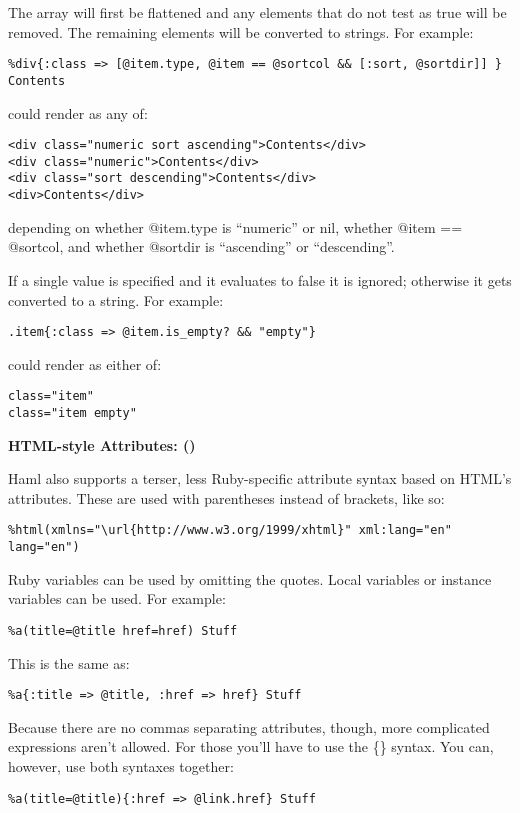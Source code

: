 \documentclass[10pt]{article}
\begin{document}
 The array will first be flattened and any elements that do not test as true will be removed. The remaining elements will be converted to strings. For example:
\begin{verbatim}
%div{:class => [@item.type, @item == @sortcol && [:sort, @sortdir]] } Contents
\end{verbatim}


 could render as any of:
\begin{verbatim}
<div class="numeric sort ascending">Contents</div>
<div class="numeric">Contents</div>
<div class="sort descending">Contents</div>
<div>Contents</div>
\end{verbatim}


 depending on whether @item.type is ``numeric'' or nil, whether @item == @sortcol, and whether @sortdir is ``ascending'' or ``descending''.


 If a single value is specified and it evaluates to false it is ignored; otherwise it gets converted to a string. For example:
\begin{verbatim}
.item{:class => @item.is_empty? && "empty"}
\end{verbatim}


 could render as either of:
\begin{verbatim}
class="item"
class="item empty"
\end{verbatim}
\textbf{HTML-style Attributes: ()}


 Haml also supports a terser, less Ruby-specific attribute syntax based on HTML’s attributes. These are used with parentheses instead of brackets, like so:
\begin{verbatim}
%html(xmlns="\url{http://www.w3.org/1999/xhtml}" xml:lang="en" lang="en")
\end{verbatim}


 Ruby variables can be used by omitting the quotes. Local variables or instance variables can be used. For example:
\begin{verbatim}
%a(title=@title href=href) Stuff
\end{verbatim}


 This is the same as:
\begin{verbatim}
%a{:title => @title, :href => href} Stuff
\end{verbatim}


 Because there are no commas separating attributes, though, more complicated expressions aren’t allowed. For those you’ll have to use the \{\} syntax. You can, however, use both syntaxes together:
\begin{verbatim}
%a(title=@title){:href => @link.href} Stuff
\end{verbatim}
\end{document}
